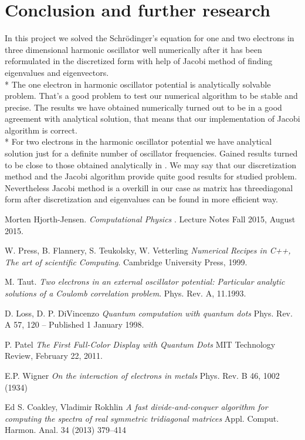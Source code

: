 \documentclass[10pt]{article}
\begin{document}
\newpage
\clearpage
\section{Conclusion and further research}\label{conc}

In this project we solved the Schr\"{o}dinger's equation for one and two electrons in three dimensional harmonic oscillator well numerically after it has been reformulated in the discretized form with help of Jacobi method of finding eigenvalues and eigenvectors.\\*
The one electron in harmonic oscillator potential is analytically solvable problem. That's a good problem to test our numerical algorithm to be stable and precise. The results we have obtained numerically turned out to be in a good agreement with analytical solution, that means that our implementation of Jacobi algorithm is correct. \\*
For two electrons in the harmonic oscillator potential we have analytical solution just for a definite number of oscillator frequencies. Gained results turned to be close to those obtained analytically in \cite{three}. We may say that our discretization method and the Jacobi algorithm provide quite good results for studied problem. Nevertheless Jacobi method is a overkill in our case as matrix has threediagonal form after discretization and eigenvalues can be found in more efficient way\cite{log}. 

\clearpage
\newpage
\begin{thebibliography}{2}
Morten Hjorth-Jensen. 
\textit{Computational Physics
}. 
Lecture Notes Fall 2015, August 2015.

W. Press, B. Flannery, S. Teukolsky, W. Vetterling 
\textit{Numerical Recipes in C++, The art of scientific Computing}. 
Cambridge University Press, 1999.

M. Taut. 
\textit{Two electrons in an external oscillator potential: Particular analytic solutions of a Coulomb correlation problem}.
Phys. Rev. A, 11.1993.

D. Loss, D. P. DiVincenzo
\textit{
Quantum computation with quantum dots
}
Phys. Rev. A 57, 120 – Published 1 January 1998.

P. Patel
\textit
{The First Full-Color Display with Quantum Dots
}
MIT Technology Review, February 22, 2011.

E.P. Wigner
\textit
{On the interaction of electrons in metals
}
Phys. Rev. B 46, 1002 (1934) 

Ed S. Coakley, Vladimir Rokhlin
\textit
{A fast divide-and-conquer algorithm for computing the spectra of real
symmetric tridiagonal matrices
}
Appl. Comput. Harmon. Anal. 34 (2013) 379–414

 
\end{thebibliography}
\end{document}

